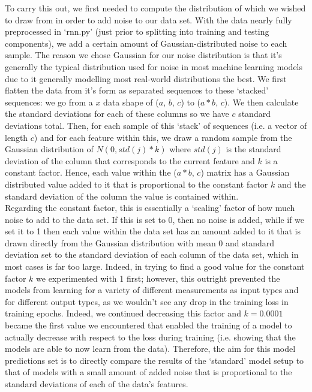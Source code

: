 \documentclass[12pt,twoside]{report}
\begin{document}
\quad To carry this out, we first needed to compute the distribution of which we wished to draw from in order to add noise to our data set. With the data nearly fully preprocessed in ‘rnn.py’ (just prior to splitting into training and testing components), we add a certain amount of Gaussian-distributed noise to each sample. The reason we chose Gaussian for our noise distribution is that it’s generally the typical distribution used for noise in most machine learning models due to it generally modelling most real-world distributions the best. We first flatten the data from it’s form as separated sequences to these ‘stacked’ sequences: we go from a $x$ data shape of ($a$, $b$, $c$) to ($a*b$, $c$). We then calculate the standard deviations for each of these columns so we have $c$ standard deviations total. Then, for each sample of this ‘stack’ of sequences (i.e. a vector of length $c$) and for each feature within this, we draw a random sample from the Gaussian distribution of $N(0, std(j)*k)$ where $std(j)$ is the standard deviation of the column that corresponds to the current feature and $k$ is a constant factor. Hence, each value within the ($a*b$, $c$) matrix has a Gaussian distributed value added to it that is proportional to the constant factor $k$ and the standard deviation of the column the value is contained within.\\

\quad Regarding the constant factor, this is essentially a ‘scaling’ factor of how much noise to add to the data set. If this is set to 0, then no noise is added, while if we set it to 1 then each value within the data set has an amount added to it that is drawn directly from the Gaussian distribution with mean 0 and standard deviation set to the standard deviation of each column of the data set, which in most cases is far too large. Indeed, in trying to find a good value for the constant factor $k$ we experimented with 1 first; however, this outright prevented the models from learning for a variety of different measurements as input types and for different output types, as we wouldn’t see any drop in the training loss in training epochs. Indeed, we continued decreasing this factor and $k=0.0001$ became the first value we encountered that enabled the training of a model to actually decrease with respect to the loss during training (i.e. showing that the models are able to now learn from the data). Therefore, the aim for this model predictions set is to directly compare the results of the ‘standard’ model setup to that of models with a small amount of added noise that is proportional to the standard deviations of each of the data’s features.
\end{document}
